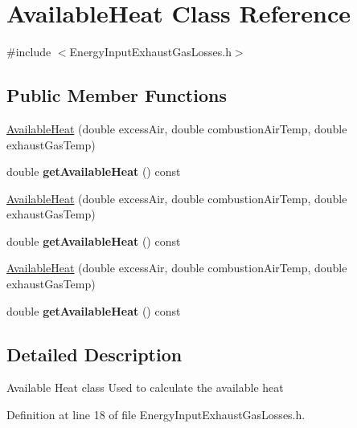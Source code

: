\hypertarget{class_available_heat}{}\section{Available\+Heat Class Reference}
\label{class_available_heat}


{\ttfamily \#include $<$Energy\+Input\+Exhaust\+Gas\+Losses.\+h$>$}

\subsection*{Public Member Functions}
\begin{DoxyCompactItemize}
\item 
\hyperlink{class_available_heat_a98f7aeccc8f074fbd46db8f9b67f7d7b}{Available\+Heat} (double excess\+Air, double combustion\+Air\+Temp, double exhaust\+Gas\+Temp)
\item 
\mbox{\label{class_available_heat_a90fcf9a6eca9bd7839b81935fcf16942}} 
double {\bfseries get\+Available\+Heat} () const
\item 
\hyperlink{class_available_heat_a98f7aeccc8f074fbd46db8f9b67f7d7b}{Available\+Heat} (double excess\+Air, double combustion\+Air\+Temp, double exhaust\+Gas\+Temp)
\item 
\mbox{\label{class_available_heat_a90fcf9a6eca9bd7839b81935fcf16942}} 
double {\bfseries get\+Available\+Heat} () const
\item 
\hyperlink{class_available_heat_a98f7aeccc8f074fbd46db8f9b67f7d7b}{Available\+Heat} (double excess\+Air, double combustion\+Air\+Temp, double exhaust\+Gas\+Temp)
\item 
\mbox{\label{class_available_heat_a90fcf9a6eca9bd7839b81935fcf16942}} 
double {\bfseries get\+Available\+Heat} () const
\end{DoxyCompactItemize}


\subsection{Detailed Description}
Available Heat class Used to calculate the available heat 

Definition at line 18 of file Energy\+Input\+Exhaust\+Gas\+Losses.\+h.



